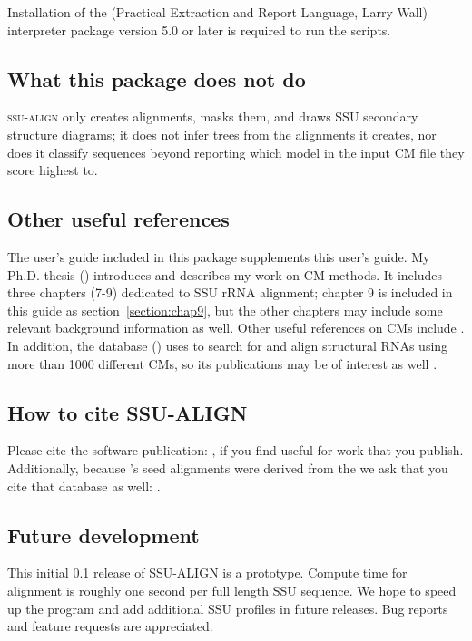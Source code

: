 Installation of the  (Practical Extraction and Report Language,
Larry Wall) interpreter package version 5.0 or later is required to
run the   scripts.

\subsection{What this package does not do}

\textsc{ssu-align} only creates alignments, masks them, and draws SSU
secondary structure diagrams; it does not infer trees from the
alignments it creates, nor does it classify sequences beyond reporting
which model in the input CM file they score highest to.

\subsection{Other useful references}

The  user's guide \cite{infernalguide} included in
this package supplements this user's guide. My Ph.D. thesis 
()
introduces and describes my work on CM methods. It includes three chapters (7-9) dedicated to
SSU rRNA alignment; chapter 9 is included in this guide as
section~\ref{section:chap9}, but the other chapters may include some
relevant background information as well. 
Other useful references on CMs include
\cite{Eddy94,Eddy02b,NawrockiEddy07,Nawrocki09,KolbeEddy09}. In
addition, the  database 
()
uses  to search for and align
structural RNAs using more than 1000 different CMs, so its
publications may be of interest as well
\cite{Griffiths-Jones03,Griffiths-Jones05,Gardner09}.

\subsection{How to cite SSU-ALIGN}

Please cite the  software publication:
\cite{Nawrocki09}, if you find  useful for work that
you publish. Additionally, because 's seed alignments were
derived from the  we ask that you cite
that database as well: \cite{CannoneGutell02}. 

\subsection{Future development}

This initial 0.1 release of \textsc{SSU-ALIGN} is a prototype. 
Compute time for alignment is roughly one second per full length SSU
sequence. We hope to speed up the program and add additional SSU
profiles in future releases. Bug reports and feature requests are
appreciated.
